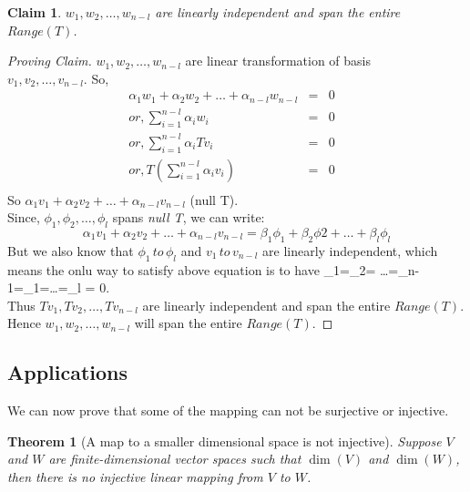 \documentclass[a4paper,12pt,reqno,oneside]{amsart}
\newtheorem{theorem}{Theorem}
\theoremstyle{plain}
\newtheorem{claim}{Claim}
\numberwithin{equation}{section}
\begin{document}
	\begin{claim}
		$w_1, w_2, \ldots, w_{n-l}$ are linearly independent and span the entire $Range(T)$.
	\end{claim}
	\begin{proof}[Proving Claim]
	$w_1, w_2, \ldots, w_{n-l}$ are linear transformation of basis \\ $v_1, v_2, \ldots, v_{n-l}$.
	So,
	\begin{eqnarray*}
		\alpha_1  w_1 + \alpha_2 w_2 + \ldots + \alpha_{n-l} w_{n-l} & = & 0 & \\
		or, \sum_{i=1}^{n-l}{\alpha_i w_i} & = & 0 &\\
		or, \sum_{i=1}^{n-l}{\alpha_i Tv_i} & = & 0 &\\
		or, T(\sum_{i=1}^{n-l}{\alpha_i v_i}) & = & 0 &\\
	\end{eqnarray*} 
	So $ \alpha_1  v_1 + \alpha_2 v_2 + \ldots + \alpha_{n-l} v_{n-l} $ \in \dim(null T).\\
	Since, $\phi_1,\phi_2,\ldots,\phi_l$ spans \emph{null T}, we can write:
	$$
		\alpha_1  v_1 + \alpha_2 v_2 + \ldots + \alpha_{n-l} v_{n-l} = \beta_1 \phi_1 + \beta_2 \phi2 + \ldots + \beta_l \phi_l
	$$
	But we also know that $\phi_1 \, to \, \phi_l$ and $v_1 \, to \, v_{n-l}$ are linearly independent, which means the onlu way to satisfy above
	equation is to have \alpha_1=\alpha_2= \ldots=\alpha_{n-1}=\beta_1=\ldots=\beta_l = 0.\\
	Thus $Tv_1, Tv_2,\ldots, Tv_{n-l}$ are linearly independent and span the entire $Range(T)$.
	Hence $w_1, w_2, \ldots, w_{n-l}$ will span the entire $Range(T)$.
  \end{proof}

\subsection{Applications}

We can now prove that some of the mapping can not be surjective or injective.
\begin{theorem}[A map to a smaller dimensional space is not injective]
	Suppose $V$ and $W$ are finite-dimensional vector spaces such that $\dim(V)$ and
	\gtr $\dim(W)$, then there is no injective linear mapping from $V$ to $W$.
\end{theorem}
\end{document}
